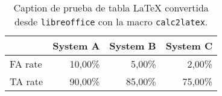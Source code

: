 \begin{table}[htbp]
\caption{Caption de prueba de tabla LaTeX convertida desde
  \texttt{libreoffice} con la macro \texttt{calc2latex}.}
\begin{center}
\begin{tabular}{|l|r|r|r|}
\hline
 & \multicolumn{1}{l|}{System A} & \multicolumn{1}{l|}{System B} & \multicolumn{1}{l|}{System C} \\ \hline
FA rate & 10,00\% & 5,00\% & 2,00\% \\ \hline
TA rate & 90,00\% & 85,00\% & 75,00\% \\ \hline
\end{tabular}
\end{center}
\label{pruebaCalc2LaTeX}
\end{table}

